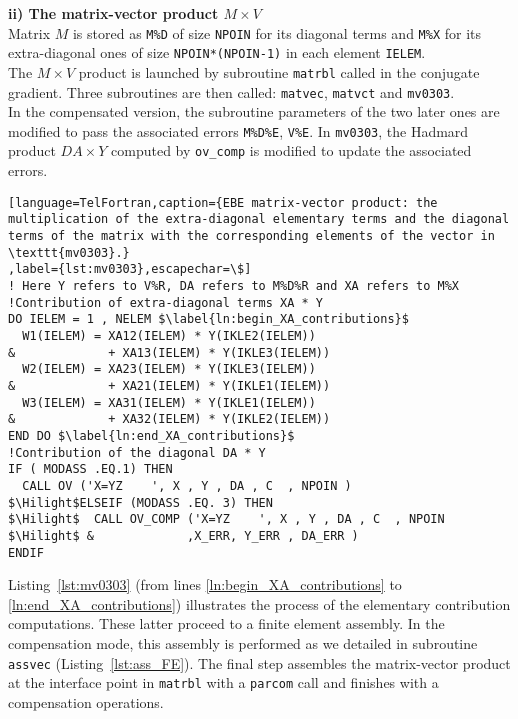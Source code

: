 %
\textbf{ii) The matrix-vector product $M \times V$}\\
Matrix $M$ is stored as \texttt{M\%D} of size \texttt{NPOIN} 
for its diagonal terms and \texttt{M\%X} for its extra-diagonal ones
of size \texttt{NPOIN*(NPOIN-1)} 
in each element \texttt{IELEM}.\\
%
The $M \times V$ product is launched by subroutine \texttt{matrbl}
called in the conjugate gradient.
Three subroutines are then called: \texttt{matvec}, \texttt{matvct}
and  \texttt{mv0303}.\\
In the compensated version, the subroutine parameters of
the two later ones are modified 
to pass the associated errors \texttt{M\%D\%E}, \texttt{V\%E}.
In \texttt{mv0303}, the Hadmard product $DA \times Y$ computed 
by \texttt{ov\_comp} is modified to update the associated errors.
%
\begin{lstlisting}[language=TelFortran,caption={EBE matrix-vector product: the multiplication of the extra-diagonal elementary terms and the diagonal terms of the matrix with the corresponding elements of the vector in \texttt{mv0303}.}
,label={lst:mv0303},escapechar=\$]
! Here Y refers to V%R, DA refers to M%D%R and XA refers to M%X  
!Contribution of extra-diagonal terms XA * Y
DO IELEM = 1 , NELEM $\label{ln:begin_XA_contributions}$
  W1(IELEM) = XA12(IELEM) * Y(IKLE2(IELEM))
&             + XA13(IELEM) * Y(IKLE3(IELEM))
  W2(IELEM) = XA23(IELEM) * Y(IKLE3(IELEM))
&             + XA21(IELEM) * Y(IKLE1(IELEM))
  W3(IELEM) = XA31(IELEM) * Y(IKLE1(IELEM))
&             + XA32(IELEM) * Y(IKLE2(IELEM))
END DO $\label{ln:end_XA_contributions}$
!Contribution of the diagonal DA * Y
IF ( MODASS .EQ.1) THEN
  CALL OV ('X=YZ    ', X , Y , DA , C  , NPOIN )
$\Hilight$ELSEIF (MODASS .EQ. 3) THEN
$\Hilight$  CALL OV_COMP ('X=YZ    ', X , Y , DA , C  , NPOIN
$\Hilight$ &             ,X_ERR, Y_ERR , DA_ERR	)
ENDIF
\end{lstlisting}
%
Listing~\ref{lst:mv0303} (from lines \ref{ln:begin_XA_contributions} to 
\ref{ln:end_XA_contributions}) illustrates the process of the 
elementary contribution computations. 
These latter proceed to a finite element assembly.
In the compensation mode, this assembly is performed as we detailed
in subroutine \texttt{assvec} (Listing~\ref{lst:ass_FE}).
%
The final step assembles the matrix-vector product 
at the interface point in \texttt{matrbl} with a \texttt{parcom} call
and finishes with a compensation operations.
%
